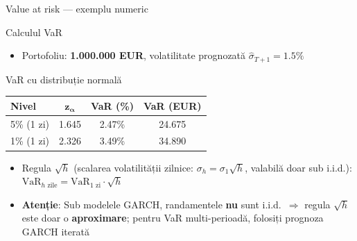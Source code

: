 \documentclass[9pt, aspectratio=169, t]{beamer}
\begin{document}
\begin{frame}{Value at risk --- exemplu numeric}
    \small
        \begin{exampleblock}{Calculul VaR}
            \begin{itemize}
                \item Portofoliu: \textbf{1.000.000 EUR}, volatilitate prognozată $\hat{\sigma}_{T+1} = 1.5\%$
            \end{itemize}
        \end{exampleblock}

        \begin{block}{VaR cu distribuție normală}
            \begin{center}
                \begin{tabular}{lccc}
                    \toprule
                    \textbf{Nivel} & $\bm{z_\alpha}$ & \textbf{VaR (\%)} & \textbf{VaR (EUR)} \\
                    \midrule
                    5\% (1 zi) & 1.645 & 2.47\% & 24.675 \\
                    1\% (1 zi) & 2.326 & 3.49\% & 34.890 \\
                    \bottomrule
                \end{tabular}
            \end{center}
        \end{block}

        \begin{rmk}
            \begin{itemize}
                \item Regula $\sqrt{h}$ (scalarea volatilității zilnice: $\sigma_h = \sigma_1 \sqrt{h}$, valabilă doar sub i.i.d.): $\text{VaR}_{h\text{ zile}} = \text{VaR}_{1\text{ zi}} \cdot \sqrt{h}$
                \item \textbf{Atenție}: Sub modelele GARCH, randamentele \textbf{nu} sunt i.i.d.\ $\Rightarrow$ regula $\sqrt{h}$ este doar o \textbf{aproximare}; pentru VaR multi-perioadă, folosiți prognoza GARCH iterată
            \end{itemize}
        \end{rmk}
\end{frame}
\end{document}
